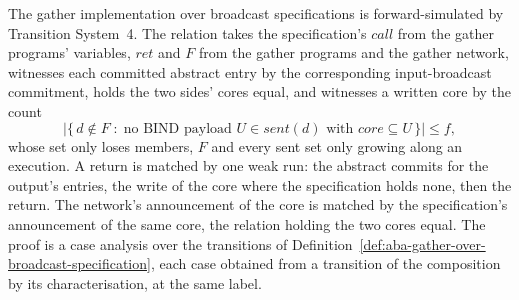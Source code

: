\begin{theorem}
  \label{thm:gather-core}
  \leanok
  The gather implementation over broadcast specifications is forward-simulated by Transition System~4.
  The relation takes the specification's $call$ from the gather programs' variables, $ret$ and $F$ from the gather programs and the gather network, witnesses each committed abstract entry by the corresponding input-broadcast commitment, holds the two sides' cores equal, and witnesses a written core by the count
  \[
    |\{\, d \notin F \;:\; \text{no } \mathrm{BIND} \text{ payload } U \in \mathit{sent}(d) \text{ with } core \subseteq U \,\}| \le f,
  \]
  whose set only loses members, $F$ and every sent set only growing along an execution.
  A return is matched by one weak run: the abstract commits for the output's entries, the write of the core where the specification holds none, then the return.
  The network's announcement of the core is matched by the specification's announcement of the same core, the relation holding the two cores equal.
  The proof is a case analysis over the transitions of Definition~\ref{def:aba-gather-over-broadcast-specification}, each case obtained from a transition of the composition by its characterisation, at the same label.
\end{theorem}

